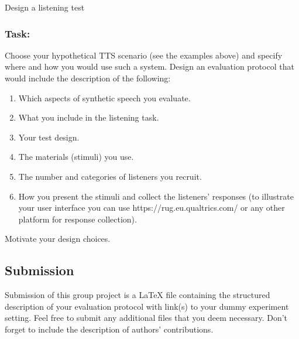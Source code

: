 \documentclass{../labbook}
\begin{document}
\begin{problem}{1}{10}{Design a listening test}

\subsubsection*{Task:}
\noindent Choose your hypothetical TTS scenario (see the examples above) and specify where and how you would use such a system. Design an evaluation protocol that would include the description of the following:

\begin{enumerate}
    \item Which aspects of synthetic speech you evaluate.
    \item What you include in the listening task.
    \item Your test design.
    \item The materials (stimuli) you use.
    \item The number and categories of listeners you recruit.
    \item How you present the stimuli and collect the listeners’ responses (to illustrate your user interface you can use https://rug.eu.qualtrics.com/ or any other platform for response collection).
\end{enumerate}

Motivate your design choices.

\subsection*{Submission}
\noindent Submission of this group project is a LaTeX file containing the structured description of your evaluation protocol with link(s) to your dummy experiment setting. Feel free to submit any additional files that you deem necessary. Don't forget to include the description of authors' contributions.
\end{problem}
\end{document}
